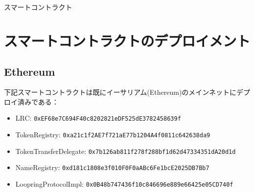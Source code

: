 \documentclass{article}
\makeatletter
\newenvironment{figurehere}
 {\def\@captype{figure}}
 {}
\makeatother
\begin{document}
\begin{appendices}
\begin{center}
\begin{figurehere}
\caption{スマートコントラクト}
\label{fig:smartcontracts}
\end{figurehere}
\end{center}

\section{スマートコントラクトのデプロイメント}

\subsection{Ethereum}
下記スマートコントラクトは既にイーサリアム(Ethereum)のメインネットにデプロイ済みである：
\begin{itemize}
\item LRC: \verb|0xEF68e7C694F40c8202821eDF525dE3782458639f|
\item TokenRegistry: \verb|0xa21c1f2AE7f721aE77b1204A4f0811c642638da9|
\item TokenTransferDelegate: \verb|0x7b126ab811f278f288bf1d62d47334351dA20d1d|
\item NameRegistry: \verb|0xd181c1808e3f010F0F0aABc6Fe1bcE2025DB7Bb7|
\item LoopringProtocolImpl: \verb|0x0B48b747436f10c846696e889e66425e05CD740f|
\end{itemize}


\end{appendices}
\end{document}
